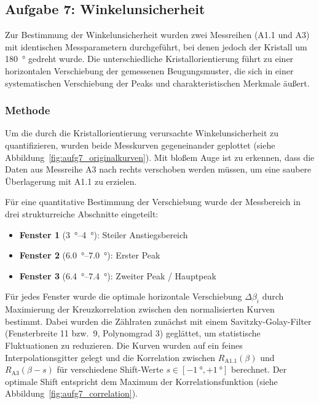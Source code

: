 
\subsection{Aufgabe 7: Winkelunsicherheit}

Zur Bestimmung der Winkelunsicherheit wurden zwei Messreihen (A1.1 und A3) mit identischen Messparametern durchgeführt, bei denen jedoch der Kristall um \SI{180}{\degree} gedreht wurde. Die unterschiedliche Kristallorientierung führt zu einer horizontalen Verschiebung der gemessenen Beugungsmuster, die sich in einer systematischen Verschiebung der Peaks und charakteristischen Merkmale äußert.

\subsubsection{Methode}

Um die durch die Kristallorientierung verursachte Winkelunsicherheit zu quantifizieren, wurden beide Messkurven gegeneinander geplottet (siehe Abbildung~\ref{fig:aufg7_originalkurven}). Mit bloßem Auge ist zu erkennen, dass die Daten aus Messreihe A3 nach rechts verschoben werden müssen, um eine saubere Überlagerung mit A1.1 zu erzielen.

Für eine quantitative Bestimmung der Verschiebung wurde der Messbereich in drei strukturreiche Abschnitte eingeteilt:
\begin{itemize}
    \item \textbf{Fenster 1} (\SIrange{3}{4}{\degree}): Steiler Anstiegsbereich
    \item \textbf{Fenster 2} (\SIrange{6.0}{7.0}{\degree}): Erster Peak
    \item \textbf{Fenster 3} (\SIrange{6.4}{7.4}{\degree}): Zweiter Peak / Hauptpeak
\end{itemize}

Für jedes Fenster wurde die optimale horizontale Verschiebung $\Delta\beta_i$ durch Maximierung der Kreuzkorrelation zwischen den normalisierten Kurven bestimmt. Dabei wurden die Zählraten zunächst mit einem Savitzky-Golay-Filter (Fensterbreite 11 bzw.\ 9, Polynomgrad 3) geglättet, um statistische Fluktuationen zu reduzieren. Die Kurven wurden auf ein feines Interpolationsgitter gelegt und die Korrelation zwischen $R_{\text{A1.1}}(\beta)$ und $R_{\text{A3}}(\beta - s)$ für verschiedene Shift-Werte $s \in [-\SI{1}{\degree}, +\SI{1}{\degree}]$ berechnet. Der optimale Shift entspricht dem Maximum der Korrelationsfunktion (siehe Abbildung~\ref{fig:aufg7_correlation}).


